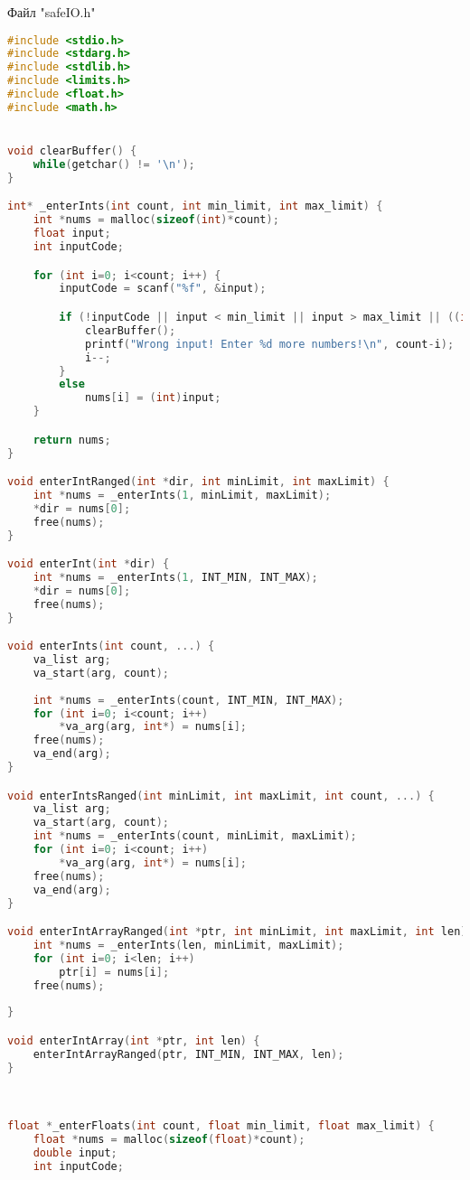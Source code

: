 \documentclass{article}
\begin{document}
Файл "safeIO.h"
\begin{lstlisting}[language=C]
#include <stdio.h>
#include <stdarg.h>
#include <stdlib.h>
#include <limits.h>
#include <float.h>
#include <math.h>


void clearBuffer() {
    while(getchar() != '\n');
}

int* _enterInts(int count, int min_limit, int max_limit) {
    int *nums = malloc(sizeof(int)*count);
    float input;
    int inputCode;

    for (int i=0; i<count; i++) {
        inputCode = scanf("%f", &input);

        if (!inputCode || input < min_limit || input > max_limit || ((int)input) != input) {
            clearBuffer();
            printf("Wrong input! Enter %d more numbers!\n", count-i);
            i--;
        }
        else
            nums[i] = (int)input;
    }

    return nums;
}

void enterIntRanged(int *dir, int minLimit, int maxLimit) {
    int *nums = _enterInts(1, minLimit, maxLimit);
    *dir = nums[0];
    free(nums);
}

void enterInt(int *dir) {
    int *nums = _enterInts(1, INT_MIN, INT_MAX);
    *dir = nums[0];
    free(nums);
}

void enterInts(int count, ...) {
    va_list arg;
    va_start(arg, count);
    
    int *nums = _enterInts(count, INT_MIN, INT_MAX);
    for (int i=0; i<count; i++)
        *va_arg(arg, int*) = nums[i];
    free(nums);
    va_end(arg);
}

void enterIntsRanged(int minLimit, int maxLimit, int count, ...) {
    va_list arg;
    va_start(arg, count);
    int *nums = _enterInts(count, minLimit, maxLimit);
    for (int i=0; i<count; i++) 
        *va_arg(arg, int*) = nums[i];
    free(nums);
    va_end(arg);
}

void enterIntArrayRanged(int *ptr, int minLimit, int maxLimit, int len) {
    int *nums = _enterInts(len, minLimit, maxLimit);
    for (int i=0; i<len; i++)
        ptr[i] = nums[i];
    free(nums);
    
}

void enterIntArray(int *ptr, int len) {
    enterIntArrayRanged(ptr, INT_MIN, INT_MAX, len);
}



float *_enterFloats(int count, float min_limit, float max_limit) {
    float *nums = malloc(sizeof(float)*count);
    double input;
    int inputCode;


\end{lstlisting}
\end{document}
